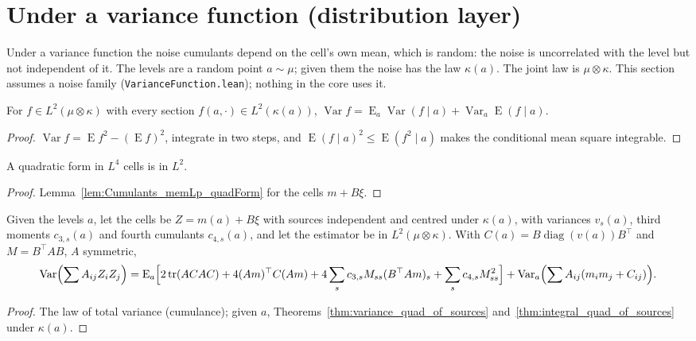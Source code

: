 \section{Under a variance function (distribution layer)}

Under a variance function the noise cumulants depend on the cell's own mean, which is random:
the noise is uncorrelated with the level but not independent of it. The levels are a random
point $a\sim\mu$; given them the noise has the law $\kappa(a)$. The joint law is $\mu\otimes\kappa$.
This section assumes a noise family (\texttt{VarianceFunction.lean}); nothing in the core uses it.

\begin{theorem}\label{thm:variance_compProd}
  \leanok
  For $f\in L^2(\mu\otimes\kappa)$ with every section $f(a,\cdot)\in L^2(\kappa(a))$,
  $\operatorname{Var} f = \operatorname{E}_a\operatorname{Var}(f\mid a) + \operatorname{Var}_a\operatorname{E}(f\mid a)$.
\end{theorem}
\begin{proof}
  \leanok
  $\operatorname{Var}f = \operatorname{E}f^2 - (\operatorname{E}f)^2$, integrate in two steps, and
  $\operatorname{E}(f\mid a)^2 \le \operatorname{E}(f^2\mid a)$ makes the conditional mean square integrable.
\end{proof}

\begin{lemma}\label{lem:memLp_quad}
  \leanok
  A quadratic form in $L^4$ cells is in $L^2$.
\end{lemma}
\begin{proof}
  \leanok
  Lemma~\ref{lem:Cumulants_memLp_quadForm} for the cells $m + B\xi$.
\end{proof}

\begin{theorem}\label{thm:variance_quad_of_conditional_sources}
  \leanok
  Given the levels $a$, let the cells be $Z = m(a) + B\xi$ with sources independent and centred
  under $\kappa(a)$, with variances $v_s(a)$, third moments $c_{3,s}(a)$ and fourth cumulants
  $c_{4,s}(a)$, and let the estimator be in $L^2(\mu\otimes\kappa)$. With $C(a) = B\operatorname{diag}(v(a))B^\top$
  and $M = B^\top AB$, $A$ symmetric,
  \[ \operatorname{Var}\Bigl(\sum A_{ij}Z_iZ_j\Bigr) = \operatorname{E}_a\Bigl[2\operatorname{tr}(ACAC) + 4(Am)^\top C(Am)
     + 4\sum_s c_{3,s}M_{ss}(B^\top Am)_s + \sum_s c_{4,s}M_{ss}^2\Bigr]
     + \operatorname{Var}_a\Bigl(\sum A_{ij}(m_im_j + C_{ij})\Bigr). \]
\end{theorem}
\begin{proof}
  \leanok
  The law of total variance (cumulance); given $a$, Theorems~\ref{thm:variance_quad_of_sources}
  and~\ref{thm:integral_quad_of_sources} under $\kappa(a)$.
\end{proof}

